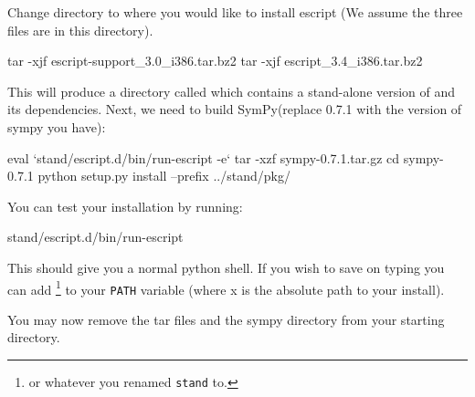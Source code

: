 Change directory to where you would like to install escript (We assume the three files are in this directory).

\begin{shellCode}
tar -xjf escript-support_3.0_i386.tar.bz2
tar -xjf escript_3.4_i386.tar.bz2

\end{shellCode}
This will produce a directory called  which contains a stand-alone version of \esfinley and its dependencies.
Next, we need to build SymPy(replace 0.7.1 with the version of sympy you have):
\begin{shellCode}
eval `stand/escript.d/bin/run-escript -e`
tar -xzf sympy-0.7.1.tar.gz 
cd sympy-0.7.1
python setup.py install --prefix ../stand/pkg/
\end{shellCode}

You can test your installation by running:
\begin{shellCode}
stand/escript.d/bin/run-escript
\end{shellCode}
This should give you a normal python shell.
If you wish to save on typing you can add \footnote{or whatever you renamed \texttt{stand} to.} to your \texttt{PATH} variable (where x is the absolute path to your install).

You may now remove the tar files and the sympy directory from your starting directory.
